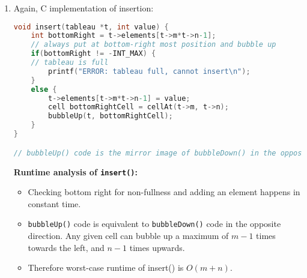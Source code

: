 \documentclass{article}
\begin{document}
\begin{enumerate}
\begin{enumerate}
\begin{lstlisting}[language=C, style=CStyle]
	// do exchange
	switch(exch) {
		case 'd':
			exchange(t, getIndex(t, c), getIndex(t, d));
			pos = d;
			break;
		case 'r':
			exchange(t, getIndex(t, c), getIndex(t, r));
			pos = r;
			break;
		default:
			break; // no exchange
	}

	// if exchanged, recursively call bubbleDown on the two exchanged positions
	if (0 == cellsEqual(t, pos, c)) { 
		bubbleDown(t, pos);
		bubbleDown(t, c); }

	\end{lstlisting}
	
	\textbf{Runtime analysis of \texttt{extractMax()}:}
	\begin{itemize}
		\item Finding max happens in constant time (first item in the array).
	\item \texttt{bubbleDown()} from any given cell can occur a maximum of $m-1$ times towards the right, and $n-1$ times downwards.
	\item Therefore worst-case runtime of extractMax() is $O(m+n)$. 
	\end{itemize}	
	
	\newpage
	\item Again, C implementation of insertion:
	
	\begin{lstlisting}[language=C, style=CStyle]
void insert(tableau *t, int value) {
	int bottomRight = t->elements[t->m*t->n-1];
	// always put at bottom-right most position and bubble up
	if(bottomRight != -INT_MAX) {
	// tableau is full
		printf("ERROR: tableau full, cannot insert\n");
	}
	else {
		t->elements[t->m*t->n-1] = value;
		cell bottomRightCell = cellAt(t->m, t->n);
		bubbleUp(t, bottomRightCell);
	}
}

// bubbleUp() code is the mirror image of bubbleDown() in the opposite directions (up and to the left) - won't include again here
	\end{lstlisting}
	
	\textbf{Runtime analysis of \texttt{insert()}:}
	\begin{itemize}
		\item Checking bottom right for non-fullness and adding an element happens in constant time.
	\item \texttt{bubbleUp()} code is equivalent to \texttt{bubbleDown()} code in the opposite direction. Any given cell can bubble up a maximum of $m-1$ times towards the left, and $n-1$ times upwards.
	\item Therefore worst-case runtime of insert() is $O(m+n)$. 
	\end{itemize} 
	

\end{enumerate}
\end{enumerate}
\end{document}
